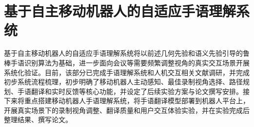 \FloatBarrier

\section{基于自主移动机器人的自适应手语理解系统}

基于自主移动机器人的自适应手语理解系统将以前述几何先验和语义先验引导的鲁棒手语识别算法为基础，进一步面向会议等需要频繁调整视角的真实交互场景开展系统化验证。目前，该部分已完成手语理解系统和人机交互相关文献调研，并完成初步系统流程梳理，初步明确了移动机器人主动感知、最佳录制视角选择、路径规划、手语翻译和实时反馈等核心功能，并设定了后续实验方案与论文撰写安排。接下来将重点搭建移动机器人手语理解系统，将手语翻译模型部署到机器人平台上，开展真实场景下的录制视角调整、翻译质量和用户交互体验实验，并在实验完成后整理结果、撰写论文。

